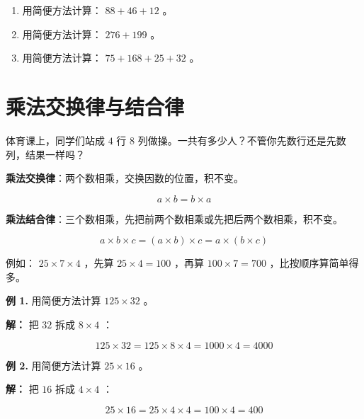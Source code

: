 \begin{practice}


\begin{enumerate}
  \item 用简便方法计算： $88 + 46 + 12$ 。
  \item 用简便方法计算： $276 + 199$ 。
  \item 用简便方法计算： $75 + 168 + 25 + 32$ 。
\end{enumerate}


\end{practice}

\section*{乘法交换律与结合律}


\begin{explore}


体育课上，同学们站成 $4$ 行 $8$ 列做操。一共有多少人？不管你先数行还是先数列，结果一样吗？

\end{explore}

\begin{understand}


\textbf{乘法交换律}：两个数相乘，交换因数的位置，积不变。

\[
a \times b = b \times a
\]


\textbf{乘法结合律}：三个数相乘，先把前两个数相乘或先把后两个数相乘，积不变。

\[
a \times b \times c = (a \times b) \times c = a \times (b \times c)
\]


例如： $25 \times 7 \times 4$ ，先算 $25 \times 4 = 100$ ，再算 $100 \times 7 = 700$ ，比按顺序算简单得多。

\end{understand}

\begin{workedexamples}


\textbf{例 1.} 用简便方法计算 $125 \times 32$ 。

\textbf{解：} 把 $32$ 拆成 $8 \times 4$ ：

\[
125 \times 32 = 125 \times 8 \times 4 = 1000 \times 4 = 4000
\]


\textbf{例 2.} 用简便方法计算 $25 \times 16$ 。

\textbf{解：} 把 $16$ 拆成 $4 \times 4$ ：

\[
25 \times 16 = 25 \times 4 \times 4 = 100 \times 4 = 400
\]


\end{workedexamples}

